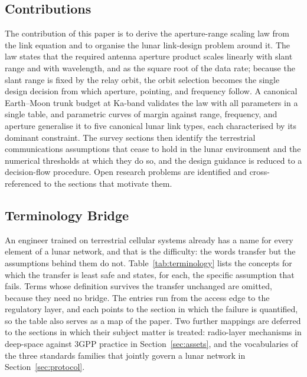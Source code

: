 \documentclass[11pt,a4paper]{article}
\begin{document}
\subsection{Contributions}
The contribution of this paper is to derive the aperture-range scaling law from the link equation and to organise the lunar link-design problem around it. The law states that the required antenna aperture product scales linearly with slant range and with wavelength, and as the square root of the data rate; because the slant range is fixed by the relay orbit, the orbit selection becomes the single design decision from which aperture, pointing, and frequency follow. A canonical Earth--Moon trunk budget at Ka-band validates the law with all parameters in a single table, and parametric curves of margin against range, frequency, and aperture generalise it to five canonical lunar link types, each characterised by its dominant constraint. The survey sections then identify the terrestrial communications assumptions that cease to hold in the lunar environment and the numerical thresholds at which they do so, and the design guidance is reduced to a decision-flow procedure. Open research problems are identified and cross-referenced to the sections that motivate them.

\subsection{Terminology Bridge}
An engineer trained on terrestrial cellular systems already has a name for every element of a lunar network, and that is the difficulty: the words transfer but the assumptions behind them do not. Table~\ref{tab:terminology} lists the concepts for which the transfer is least safe and states, for each, the specific assumption that fails. Terms whose definition survives the transfer unchanged are omitted, because they need no bridge. The entries run from the access edge to the regulatory layer, and each points to the section in which the failure is quantified, so the table also serves as a map of the paper. Two further mappings are deferred to the sections in which their subject matter is treated: radio-layer mechanisms in deep-space against 3GPP practice in Section~\ref{sec:assets}, and the vocabularies of the three standards families that jointly govern a lunar network in Section~\ref{sec:protocol}.
\end{document}
